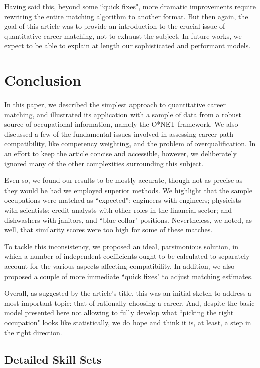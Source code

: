 \documentclass{article}
\begin{document}
Having said this, beyond some ``quick fixes", more dramatic improvements
require rewriting the entire matching algorithm to another format. But then
again, the goal of this article was to provide an introduction to the crucial
issue of quantitative career matching, not to exhaust the subject. In future
works, we expect to be able to explain at length our sophisticated and
performant models.

\section{Conclusion}
In this paper, we described the simplest approach to quantitative career
matching, and illustrated its application with a sample of data from a robust
source of occupational information, namely the O*NET framework. We also
discussed a few of the fundamental issues involved in assessing career path
compatibility, like competency weighting, and the problem of overqualification.
In an effort to keep the article concise and accessible, however, we
deliberately ignored many of the other complexities surrounding this subject.

Even so, we found our results to be mostly accurate, though not as precise as
they would be had we employed superior methods. We highlight that the sample
occupations were matched as ``expected": engineers with engineers; physicists
with scientists; credit analysts with other roles in the financial sector; and
dishwashers with janitors, and ``blue-collar" positions. Nevertheless, we
noted, as well, that similarity scores were too high for some of these matches.

To tackle this inconsistency, we proposed an ideal, parsimonious solution, in
which a number of independent coefficients ought to be calculated to separately
account for the various aspects affecting compatibility. In addition, we also
proposed a couple of more immediate ``quick fixes" to adjust matching
estimates.

Overall, as suggested by the article's title, this was an initial sketch to
address a most important topic: that of rationally choosing a career. And,
despite the basic model presented here not allowing to fully develop what
``picking the right occupation" looks like statistically, we do hope and think
it is, at least, a step in the right direction.

\newpage
\printbibliography[
    heading=bibintoc,
    title={References}
]

\newpage
\begin{appendices}
    \section{Detailed Skill Sets}
    \DetailedSkillSets
\end{appendices}
\end{document}
